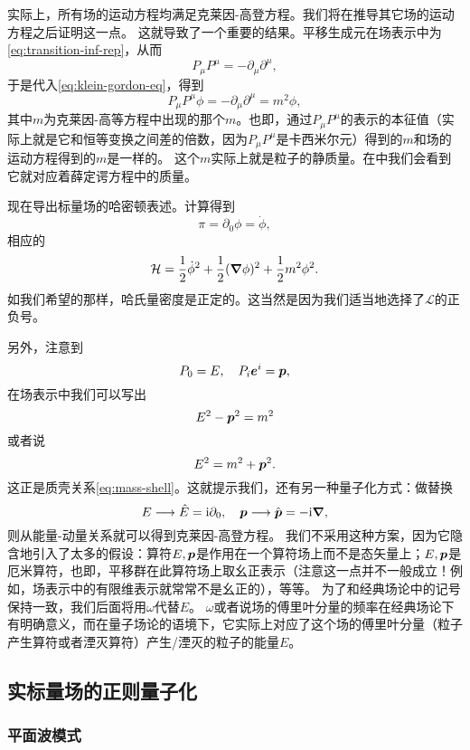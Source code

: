 \documentclass[hyperref, UTF8, a4paper]{ctexart}
\newcommand*{\ii}{\mathrm{i}}
\renewcommand{\autoref}{\prettyref}
\begin{document}
实际上，所有场的运动方程均满足克莱因-高登方程。我们将在推导其它场的运动方程之后证明这一点。
这就导致了一个重要的结果。平移生成元在场表示中为\eqref{eq:transition-inf-rep}，从而
\[
    P_\mu P^\mu = - \partial_\mu \partial^\mu,
\]
于是代入\eqref{eq:klein-gordon-eq}，得到
\[
    P_\mu P^\mu \phi = - \partial_\mu \partial^\mu = m^2 \phi,
\]
其中$m$为克莱因-高等方程中出现的那个$m$。也即，通过$P_\mu P^\mu$的表示的本征值（实际上就是它和恒等变换之间差的倍数，因为$P_\mu P^\mu$是卡西米尔元）得到的$m$和场的运动方程得到的$m$是一样的。
这个$m$实际上就是粒子的静质量。在\autoref{sec:sch-eq-from-kg}中我们会看到它就对应着薛定谔方程中的质量。

现在导出标量场的哈密顿表述。计算得到
\begin{equation}
    \pi = \partial_0 \phi = \dot{\phi},
    \label{eq:klein-gordon-pi}
\end{equation}
相应的
\begin{equation}
    \mathcal{H} = \frac{1}{2} \dot{\phi}^2 + \frac{1}{2} (\grad{\phi})^2 + \frac{1}{2} m^2 \phi^2.
\end{equation}
如我们希望的那样，哈氏量密度是正定的。这当然是因为我们适当地选择了$\mathcal{L}$的正负号。

另外，注意到 %
\[
    P_0 = E, \quad P_i \vb*{e}^i = \vb*{p},
\]
在场表示中我们可以写出
\[
    E^2 - \vb*{p}^2 = m^2
\]
或者说
\[
    E^2 = m^2 + \vb*{p}^2.
\]
这正是质壳关系\eqref{eq:mass-shell}。这就提示我们，还有另一种量子化方式：做替换
\[
    E \longrightarrow \hat{E} = \ii \partial_0, \quad \vb*{p} \longrightarrow \hat{\vb*{p}} = - \ii \grad,
\]
则从能量-动量关系就可以得到克莱因-高登方程。
我们不采用这种方案，因为它隐含地引入了太多的假设：算符$E, \vb*{p}$是作用在一个算符场上而不是态矢量上；$E,\vb*{p}$是厄米算符，也即，平移群在此算符场上取幺正表示（注意这一点并不一般成立！例如，场表示中的有限维表示就常常不是幺正的），等等。
为了和经典场论中的记号保持一致，我们后面将用$\omega$代替$E$。
$\omega$或者说场的傅里叶分量的频率在经典场论下有明确意义，而在量子场论的语境下，它实际上对应了这个场的傅里叶分量（粒子产生算符或者湮灭算符）产生/湮灭的粒子的能量$E$。

\subsection{实标量场的正则量子化}

\subsubsection{平面波模式}
\end{document}
